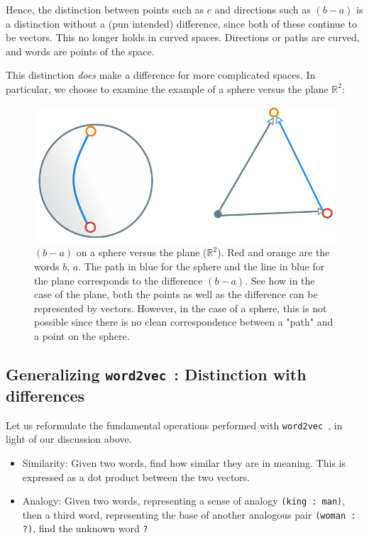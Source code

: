 \documentclass[11pt]{book}
\newcommand{\wtov}{\texttt{word2vec }}
\newcommand{\R}{\ensuremath{\mathbb R}}
\begin{document}
Hence, the distinction between points such as $c$  and directions such as $(b - a)$
is a distinction without a (pun intended) difference, since both of these
continue to be vectors.  This no longer holds in curved spaces. Directions or
paths are curved, and words are points of the space.


This distinction \emph{does} make a difference for more complicated spaces.
In particular, we choose to examine the example of a sphere versus the plane 
$\mathbb R^2$:

\begin{figure}[H]
\includegraphics[width=\textwidth]{./sphere-shortest-path.png}
\caption{$(b - a)$ on a sphere versus the plane ($\R^2$). Red and
  orange are the words $b$, $a$. The path in blue for the sphere and the
  line in blue for the plane corresponds to the difference $(b - a)$. See
  how in the case of the plane, both the points as well as the difference can
  be represented by vectors. However, in the case of a sphere, this is
  not possible since there is no clean correspondence between a "path" and
  a point on the sphere.}
\end{figure}


\subsection{Generalizing \wtov: Distinction with differences}

Let us reformulate the fundamental operations performed with \wtov, in light
of our discussion above.

\begin{itemize}
\item Similarity: Given two words, find how similar they are in meaning. This is
     expressed as a dot product between the two vectors.
\item Analogy: Given two words, representing a sense of analogy \texttt{(king : man)},
      then a third word, representing the base of another analogous
      pair \texttt{(woman : ?)}, find the unknown word \texttt{?}
\end{itemize}
\end{document}
